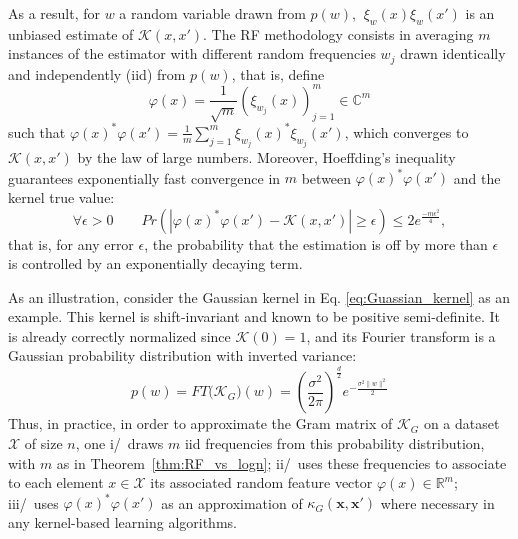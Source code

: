 As a result, for $w$ a random variable drawn from $p(w)$, $\ \xi_w(x)\xi_w(x')$ is an unbiased estimate of $\mathcal{K}(x,x')$. The RF methodology consists in averaging $m$ instances of the estimator with different random frequencies $w_j$ drawn identically and independently (iid) from $p(w)$, that is, define
\[
\varphi(x) = \frac{1}{\sqrt{m}} ( \xi_{w_j}(x) )_{j=1}^m \in \mathbb{C}^m
\]
such that $\varphi(x)^*\varphi(x')=\frac{1}{m} \sum_{j=1}^m \xi_{w_j}(x)^*\xi_{w_j}(x')$, which converges to $\mathcal{K}(x,x')$ by the law of large numbers. Moreover, Hoeffding's inequality guarantees exponentially fast convergence in $m$ between $\varphi(x)^*\varphi(x')$ and the kernel true value:
\begin{equation}
   \forall \epsilon >0\qquad Pr(|\varphi(x)^*\varphi(x')-\mathcal{K}(x,x')|\geq\epsilon)\leq2e^\frac{-m\epsilon^2}{4},
\end{equation}
that is, for any error $\epsilon$, the probability that the estimation is off by more than $\epsilon$ is controlled by an exponentially decaying term.


As an illustration, consider the Gaussian kernel in Eq. \ref{eq:Guassian_kernel} as an example. This kernel is shift-invariant and known to be positive semi-definite. It is already correctly normalized since $\mathcal{K}(0) = 1$, and its Fourier transform is a Gaussian probability distribution with inverted variance:
\[p(w)=FT\big(\mathcal{K}_G\big)(w)=\left(\frac{\sigma^2}{2\pi}\right)^\frac{d}{2}e^{-\frac{\sigma^2\|w\|^2}{2}}\]
Thus, in practice, in order to approximate the Gram matrix of $\mathcal{K}_G$ on a dataset $\mathcal{X}$ of size $n$, one i/~draws $m$ iid frequencies from this probability distribution, with $m$ as in Theorem~\ref{thm:RF_vs_logn}; ii/~uses these frequencies to associate to each element $x\in\mathcal{X}$ its associated random feature vector $\varphi(x)\in\mathbb{R}^m$; iii/~uses $\varphi(x)^*\varphi(x')$ as an approximation of $\kappa_G(\mathbf{x},\mathbf{x}')$ where necessary in any kernel-based learning algorithms.

